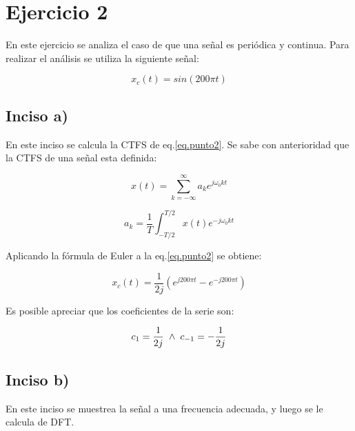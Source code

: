 \documentclass{article}
\begin{document}

\section{Ejercicio 2}

    En este ejercicio se analiza el caso de que una señal es periódica y continua. Para realizar el análisis se utiliza la siguiente señal: 

    \begin{equation}
        \label{eq.punto2}
        x_c(t) = sin( 200 \pi t )
    \end{equation}

    \subsection*{Inciso a)}

    En este inciso se calcula la CTFS de eq.\ref{eq.punto2}. Se sabe con anterioridad que la CTFS de una señal
    esta definida:
    
    \begin{equation}
        x(t)= \sum_{k=-\infty}^{\infty} a_k e^{j\omega_0 kt}
    \end{equation}

    \begin{equation}
        a_k = \frac{1}{T} \int_{-T/2}^{T/2} x(t)e^{-j\omega_0 kt}
    \end{equation}

    Aplicando la fórmula de Euler a la eq.\ref{eq.punto2} se obtiene:

    \begin{equation}
        x_c(t)=\frac{1}{2j}( e^{j200\pi t} - e^{-j200 \pi t})
    \end{equation}

    Es posible apreciar que los coeficientes de la serie son: 

    \begin{equation}
        c_1 = \frac{1}{2j} \hspace*{.1cm} \land \hspace*{.1cm} c_{-1}=-\frac{1}{2j}
    \end{equation}

    \subsection*{Inciso b)}

    En este inciso se muestrea la señal a una frecuencia adecuada, y luego se le calcula de DFT.
\end{document}
